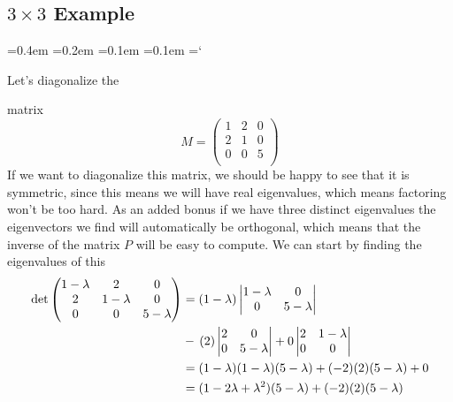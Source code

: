 
\subsection*{$3\times3$ Example}

{\ttfamily
{}\font=0.4em
\font=0.2em
\font=0.1em
\font=0.1em
\hyphenchar\font=`\-


\hypertarget{scripts_diagonalizing_symmetric_matrices_3by3_example}{Let's diagonalize the} matrix
\[
M = 
\begin{pmatrix}
1 &2 & 0 \\
2 & 1 & 0 \\
0& 0 & 5  \\
\end{pmatrix}
\] 
If we want to diagonalize this matrix, we should be happy to see that it is symmetric, since this means we will have real eigenvalues, which means factoring won't be too hard.  As an added bonus if we have three distinct eigenvalues the eigenvectors we find will automatically be orthogonal, which means that the inverse of the matrix $P$ will be easy to compute. We can start by finding the eigenvalues of this 
\begin{align*}
\det \begin{pmatrix}
1-\lambda &\mc2 & \mc0 \\
\mc2 & 1 -\lambda& \mc0 \\
\mc0& \mc0 & 5-\lambda  \\
\end{pmatrix}
 &= (1-\lambda) 
\begin{vmatrix}
1 -\lambda&\mc 0 \\
\mc0 & 5-\lambda  \\
\end{vmatrix}
\\
 & - \, (2) 
 \begin{vmatrix}
2 & \mc0 \\
0& 5-\lambda  \\
\end{vmatrix}
 + 0 \begin{vmatrix}
2 & 1 -\lambda \\
0& \mc0   \\
\end{vmatrix}\\
&=(1-\lambda)(1-\lambda)(5-\lambda)+ (-2)(2)(5-\lambda) +0\\
&=(1-2\lambda +\lambda^2)(5-\lambda) + (-2)(2)(5-\lambda)\\

\end{align*}}
